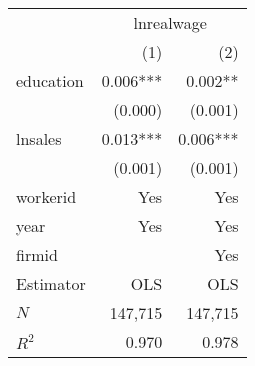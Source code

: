 \begin{tabular}{lrr}
\toprule
          & \multicolumn{2}{c}{lnrealwage} \\ 
\cmidrule(lr){2-3} 
          &      (1) &                 (2) \\ 
\midrule
education & 0.006*** &             0.002** \\ 
          &  (0.000) &             (0.001) \\ 
lnsales   & 0.013*** &            0.006*** \\ 
          &  (0.001) &             (0.001) \\ 
\midrule
workerid  &      Yes &                 Yes \\ 
year      &      Yes &                 Yes \\ 
firmid    &          &                 Yes \\ 
\midrule
Estimator &      OLS &                 OLS \\ 
\midrule
$N$       &  147,715 &             147,715 \\ 
$R^2$     &    0.970 &               0.978 \\ 
\bottomrule
\end{tabular}
